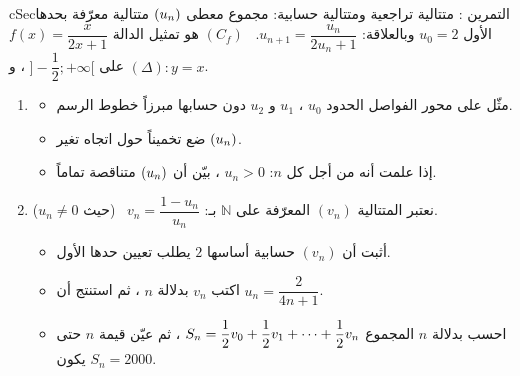 \documentclass[12pt,a4paper]{article}
\newenvironment{BOX}[2]{\begin{otherlanguage}{english}\begin{arbox}{#1}{#2}}{\end{arbox}\end{otherlanguage}}
\newcounter{exo}
\newenvironment{tamrin}[1]{\stepcounter{exo}\begin{BOX}{cSec}{التمرين \theexo: #1}}{\end{BOX}}
\renewcommand{\cdots}{\mathinner{\cdotp\cdotp\cdotp}}
\newcommand{\N}{\mathbb{N}}
\newenvironment{sq}{\begin{itemize}[leftmargin=2.4em,itemsep=3pt]}{\end{itemize}}
\newcommand{\qa}{\item[(أ)]}\newcommand{\qb}{\item[(ب)]}\newcommand{\qc}{\item[(جـ)]}\newcommand{\qd}{\item[(د)]}\newcommand{\qe}{\item[(هـ)]}
\begin{document}
\begin{tamrin}{متتالية تراجعية ومتتالية حسابية: مجموع معطى}
$(u_n)$ متتالية معرّفة بحدها الأول $u_0=2$ وبالعلاقة: $u_{n+1}=\dfrac{u_n}{2u_n+1}$. \ $(C_f)$ هو تمثيل الدالة $f(x)=\dfrac{x}{2x+1}$ على $\Big]-\dfrac12;+\infty\Big[$ ، و $(\Delta):y=x$.
\begin{enumerate}
\item
\begin{sq}
\qa مثّل على محور الفواصل الحدود $u_0$ ، $u_1$ و $u_2$ دون حسابها مبرزاً خطوط الرسم.
\qb ضع تخميناً حول اتجاه تغير $(u_n)$.
\qc إذا علمت أنه من أجل كل $n$: $u_n>0$ ، بيّن أن $(u_n)$ متناقصة تماماً.
\end{sq}
\item نعتبر المتتالية $(v_n)$ المعرّفة على $\N$ بـ: $v_n=\dfrac{1-u_n}{u_n}$ \ (حيث $u_n\ne0$).
\begin{sq}
\qa أثبت أن $(v_n)$ حسابية أساسها $2$ يطلب تعيين حدها الأول.
\qb اكتب $v_n$ بدلالة $n$ ، ثم استنتج أن $u_n=\dfrac{2}{4n+1}$.
\qc احسب بدلالة $n$ المجموع $S_n=\dfrac12v_0+\dfrac12v_1+\cdots+\dfrac12v_n$ ، ثم عيّن قيمة $n$ حتى يكون $S_n=2000$.
\end{sq}
\end{enumerate}
\end{tamrin}
\end{document}
